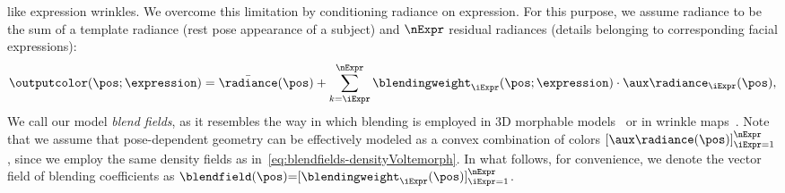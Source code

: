     like expression wrinkles.
    We overcome this limitation by conditioning radiance on expression.
    For this purpose, we assume radiance to be the sum of a template radiance (\ie rest pose appearance of a subject) and $\nExpr$ residual radiances (\ie details belonging to corresponding facial expressions):
    \begin{equation}
      \outputcolor(\pos; \expression) = \bar\radiance(\pos) + \sum_{k=\iExpr}^\nExpr
      \blendingweight_\iExpr(\pos; \expression)
      \cdot
      \aux\radiance_\iExpr(\pos),
      \label{eq:blendfields-multiheadradiance}
    \end{equation}
    We call our model \textit{blend fields}, as it resembles the way in which
    blending is employed in 3D morphable models~\cite{blanz1999morphable} or
    in wrinkle maps~\cite{oat2007animated}.
    Note that we assume that pose-dependent geometry can be effectively
    modeled as {a convex combination of colors
    $[\aux\radiance(\pos)]_{\iExpr=1}^{\nExpr}$}, since we employ the same
    density fields as in~\cref{eq:blendfields-densityVoltemorph}.
    In what follows, for convenience, we denote the vector field of blending
    coefficients as $\blendfield(\pos) {=}
    [\blendingweight_\iExpr(\pos)]_{\iExpr=1}^{\nExpr}$.

